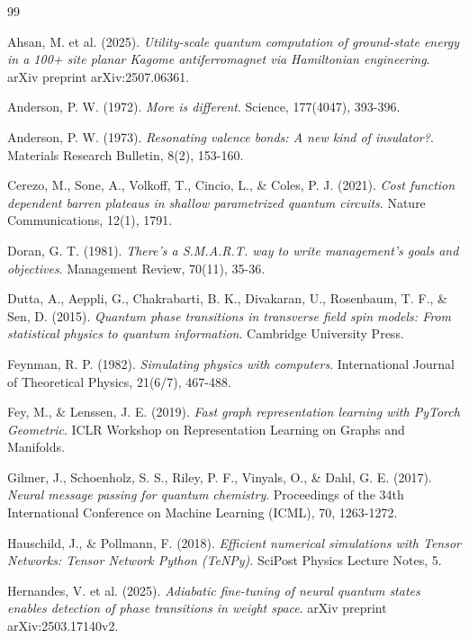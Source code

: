 \documentclass[11pt,a4paper,spanish]{book}
\begin{document}
\begin{thebibliography}{99}

 Ahsan, M. et al. (2025). \emph{Utility-scale quantum computation of ground-state energy in a 100+ site planar Kagome antiferromagnet via Hamiltonian engineering}. arXiv preprint arXiv:2507.06361.

 Anderson, P. W. (1972). \emph{More is different}. Science, 177(4047), 393-396.

 Anderson, P. W. (1973). \emph{Resonating valence bonds: A new kind of insulator?}. Materials Research Bulletin, 8(2), 153-160.

 Cerezo, M., Sone, A., Volkoff, T., Cincio, L., \& Coles, P. J. (2021). \emph{Cost function dependent barren plateaus in shallow parametrized quantum circuits}. Nature Communications, 12(1), 1791.

 Doran, G. T. (1981). \emph{There's a S.M.A.R.T. way to write management's goals and objectives}. Management Review, 70(11), 35-36.

 Dutta, A., Aeppli, G., Chakrabarti, B. K., Divakaran, U., Rosenbaum, T. F., \& Sen, D. (2015). \emph{Quantum phase transitions in transverse field spin models: From statistical physics to quantum information}. Cambridge University Press.

 Feynman, R. P. (1982). \emph{Simulating physics with computers}. International Journal of Theoretical Physics, 21(6/7), 467-488.

 Fey, M., \& Lenssen, J. E. (2019). \emph{Fast graph representation learning with PyTorch Geometric}. ICLR Workshop on Representation Learning on Graphs and Manifolds.

 Gilmer, J., Schoenholz, S. S., Riley, P. F., Vinyals, O., \& Dahl, G. E. (2017). \emph{Neural message passing for quantum chemistry}. Proceedings of the 34th International Conference on Machine Learning (ICML), 70, 1263-1272.

 Hauschild, J., \& Pollmann, F. (2018). \emph{Efficient numerical simulations with Tensor Networks: Tensor Network Python (TeNPy)}. SciPost Physics Lecture Notes, 5.

 Hernandes, V. et al. (2025). \emph{Adiabatic fine-tuning of neural quantum states enables detection of phase transitions in weight space}. arXiv preprint arXiv:2503.17140v2.


\end{thebibliography}
\end{document}
